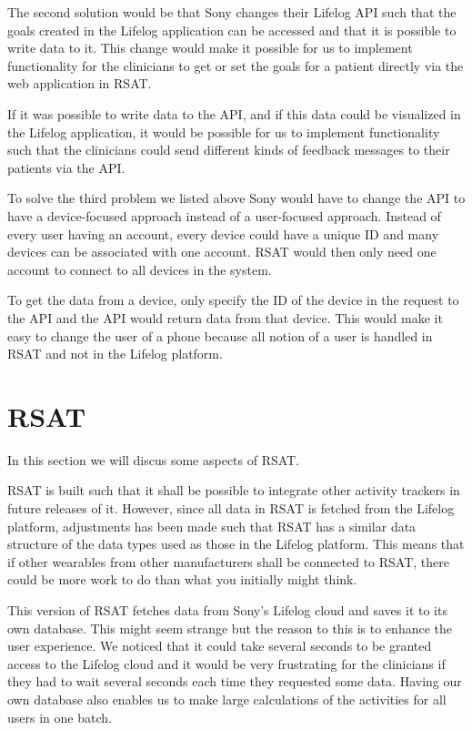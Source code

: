 \documentclass{cslthse-msc}
\begin{document}
The second solution would be that Sony changes their Lifelog API such that the goals created in the Lifelog application can be accessed and that it is possible to write data to it. This change would make it possible for us to implement functionality for the clinicians to get or set the goals for a patient directly via the web application in RSAT. 

If it was possible to write data to the API, and if this data could be visualized in the Lifelog application, it would be possible for us to implement functionality such that the clinicians could send different kinds of feedback messages to their patients via the API. 

To solve the third problem we listed above Sony would have to change the API to have a device-focused approach instead of a user-focused approach. Instead of every user having an account, every device could have a unique ID and many devices can be associated with one account. RSAT would then only need one account to connect to all devices in the system. 

To get the data from a device, only specify the ID of the device in the request to the API and the API would return data from that device. This would make it easy to change the user of a phone because all notion of a user is handled in RSAT and not in the Lifelog platform. 





\section{RSAT}

In this section we will discus some aspects of RSAT. 

RSAT is built such that it shall be possible to integrate other activity trackers in future releases of it. However, since all data in RSAT is fetched from the Lifelog platform, adjustments has been made such that RSAT has a similar data structure of the data types used as those in the Lifelog platform. This means that if other wearables from other manufacturers shall be connected to RSAT, there could be more work to do than what you initially might think. 

This version of RSAT fetches data from Sony’s Lifelog cloud and saves it to its own database. This might seem strange but the reason to this is to enhance the user experience. We noticed that it could take several seconds to be granted access to the Lifelog cloud and it would be very frustrating for the clinicians if they had to wait several seconds each time they requested some data. Having our own database also enables us to make large calculations of the activities for all users in one batch.  
\end{document}
